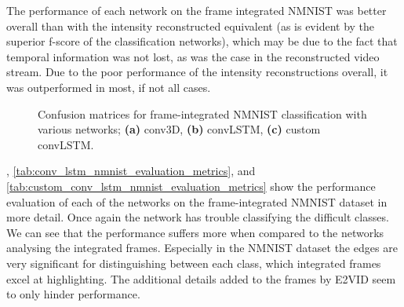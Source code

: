 The performance of each network on the frame integrated NMNIST was better overall than with the intensity reconstructed equivalent (as is evident by the superior f-score of the classification networks), which may be due to the fact that temporal information was not lost, as was the case in the reconstructed video stream. Due to the poor performance of the intensity reconstructions overall, it was outperformed in most, if not all cases.

\begin{figure}[htb]%
    \centering
    \qquad
    \qquad
    \caption{Confusion matrices for frame-integrated NMNIST classification with various networks; \textbf{(a)} conv3D, \textbf{(b)} convLSTM, \textbf{(c)} custom convLSTM.}%
    \label{fig:nmnist_c_matrices}%
\end{figure}

, \cref{tab:conv_lstm_nmnist_evaluation_metrics}, and \cref{tab:custom_conv_lstm_nmnist_evaluation_metrics} show the performance evaluation of each of the networks on the frame-integrated NMNIST dataset in more detail. Once again the network has trouble classifying the difficult classes. We can see that the performance suffers more when compared to the networks analysing the integrated frames. Especially in the NMNIST dataset the edges are very significant for distinguishing between each class, which integrated frames excel at highlighting. The additional details added to the frames by E2VID seem to only hinder performance.

